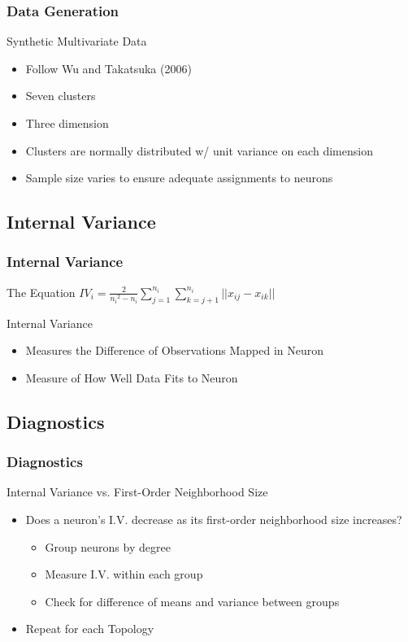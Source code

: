 \documentclass[nototal,handout]{beamer}
\begin{document}
\begin{frame}
	\frametitle{Data Generation}
 
\begin{block}{Synthetic Multivariate Data}
 \begin{itemize}
 \item  Follow Wu and Takatsuka (2006) 
 \item  Seven clusters
 \item  Three dimension
 \item  Clusters are normally distributed w/ unit variance on each dimension
 \item  Sample size varies to ensure adequate assignments to neurons
 \end{itemize}
 \end{block} \end{frame} 

\subsection{Internal Variance} 

\begin{frame}
	\frametitle{Internal Variance}
 
\begin{block}{The Equation}
  \({IV_i} = \frac{2}{{n_i}^2-{n_i}}\sum_{j=1}^{n_i}\sum_{k=j+1}^{n_i} ||{x_{ij}}-{x_{ik}}||\)
 \end{block} 
\begin{block}{Internal Variance}
 \begin{itemize}
 \item  Measures the Difference of Observations Mapped in Neuron
 \item  Measure of How Well Data Fits to Neuron
 \end{itemize}
 \end{block} \end{frame} 

\subsection{Diagnostics} 

\begin{frame}
	\frametitle{Diagnostics}
 
\begin{block}{Internal Variance vs. First-Order Neighborhood Size}
 \begin{itemize}
 \item  Does a neuron's I.V. decrease as its first-order neighborhood size increases?
 \begin{itemize}
 \item  Group neurons by degree
 \item  Measure I.V. within each group
 \item  Check for difference of means and variance between groups
 \end{itemize}
 \item  Repeat for each Topology
 \end{itemize}
 \end{block} \end{frame} 
\end{document}
